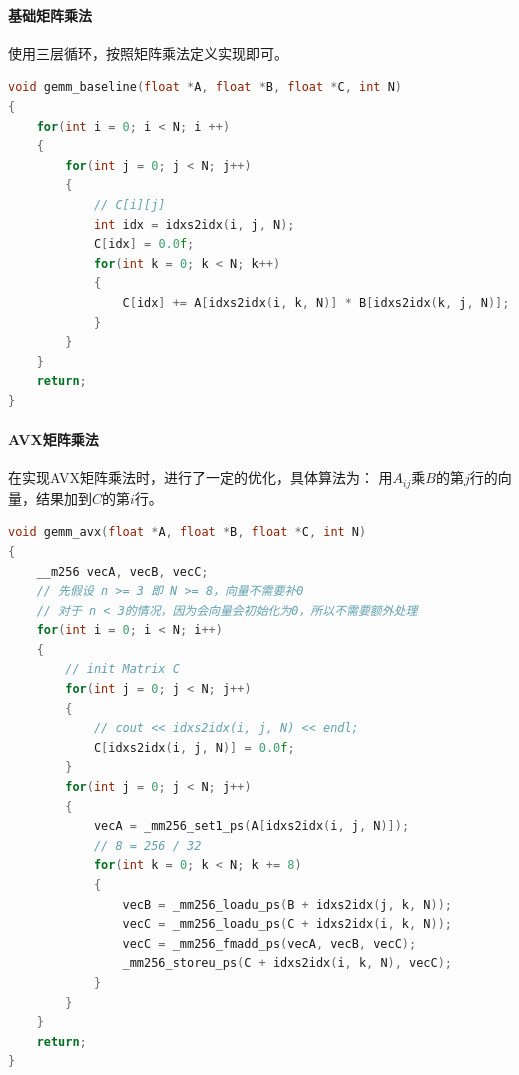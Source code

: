 \documentclass[UTF8]{article}
\begin{document}
    \paragraph{基础矩阵乘法}
    使用三层循环，按照矩阵乘法定义实现即可。
    \begin{lstlisting}[language=c++]
void gemm_baseline(float *A, float *B, float *C, int N)
{
    for(int i = 0; i < N; i ++)
    {
        for(int j = 0; j < N; j++)
        {
            // C[i][j]
            int idx = idxs2idx(i, j, N);
            C[idx] = 0.0f;
            for(int k = 0; k < N; k++)
            {
                C[idx] += A[idxs2idx(i, k, N)] * B[idxs2idx(k, j, N)];
            }
        }
    }
    return;
}
    \end{lstlisting}
    \paragraph*{AVX矩阵乘法}
    在实现AVX矩阵乘法时，进行了一定的优化，具体算法为：
    用$A_{ij}$乘$B$的第$j$行的向量，结果加到$C$的第$i$行。
    \begin{lstlisting}[language=c++]
void gemm_avx(float *A, float *B, float *C, int N)
{
    __m256 vecA, vecB, vecC;
    // 先假设 n >= 3 即 N >= 8，向量不需要补0
    // 对于 n < 3的情况，因为会向量会初始化为0，所以不需要额外处理
    for(int i = 0; i < N; i++)
    {
        // init Matrix C
        for(int j = 0; j < N; j++)
        {
            // cout << idxs2idx(i, j, N) << endl;
            C[idxs2idx(i, j, N)] = 0.0f;
        }
        for(int j = 0; j < N; j++)
        {
            vecA = _mm256_set1_ps(A[idxs2idx(i, j, N)]);
            // 8 = 256 / 32
            for(int k = 0; k < N; k += 8)
            {
                vecB = _mm256_loadu_ps(B + idxs2idx(j, k, N));
                vecC = _mm256_loadu_ps(C + idxs2idx(i, k, N));
                vecC = _mm256_fmadd_ps(vecA, vecB, vecC);
                _mm256_storeu_ps(C + idxs2idx(i, k, N), vecC);
            }
        }
    }
    return;
}
    \end{lstlisting}
\end{document}
